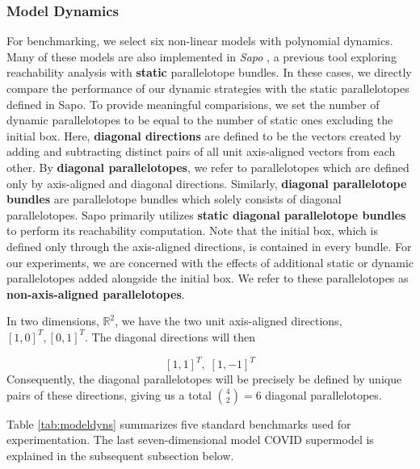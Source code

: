 \subsubsection{Model Dynamics}
For benchmarking, we select six non-linear models with polynomial dynamics. Many of these models are also implemented in \emph{Sapo} \cite{dreossi2017sapo}, a previous tool exploring reachability analysis with {\bf static} parallelotope bundles. In these cases, we directly compare the performance of our dynamic strategies with the static parallelotopes defined in Sapo. To provide meaningful comparisions, we set the number of dynamic parallelotopes to be equal to the number of static ones excluding the initial box. Here, {\bf diagonal directions} are defined to be the vectors created by adding and subtracting distinct pairs of all unit axis-aligned vectors from each other. By {\bf diagonal parallelotopes}, we refer to parallelotopes which are defined only by axis-aligned and diagonal directions. Similarly, {\bf diagonal parallelotope bundles} are parallelotope bundles which solely consists of diagonal parallelotopes. Sapo primarily utilizes {\bf static diagonal parallelotope bundles} to perform its reachability computation.
Note that the initial box, which is defined only through the axis-aligned directions, is contained in every bundle.
For our experiments, we are concerned with the effects of additional static or dynamic parallelotopes added alongside the initial box. We refer to these parallelotopes as {\bf non-axis-aligned parallelotopes}.

\begin{example}
In two dimensions, $\mathbb{R}^2$, we have the two unit axis-aligned directions, $[1,0]^T, [0,1]^T$. The diagonal directions will then

\[ [1,1]^T, \; [1,-1]^T\]
Consequently, the diagonal parallelotopes will be precisely be defined by unique pairs of these directions, giving us a total ${4 \choose 2} = 6$ diagonal parallelotopes.
%
%
\end{example}
Table \ref{tab:modeldyns} summarizes five standard benchmarks used for experimentation. The last seven-dimensional model COVID supermodel is explained in the subsequent subsection below.

